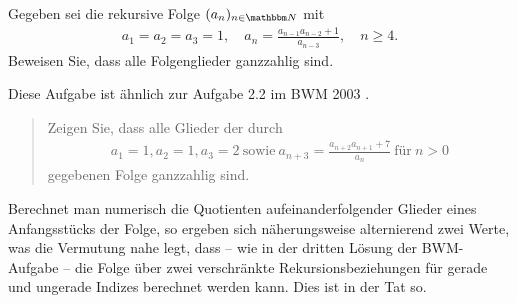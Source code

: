 \documentclass[11pt,a4paper]{article}
\begin{document}
\begin{aufgabe} Gegeben sei die rekursive Folge $(a_n)_{n\in\N } $ mit
\begin{gather*}
a_1=a_2=a_3=1,\quad a_{n}=\frac{a_{n-1}a_{n-2} +1}{a_{n-3}}, \quad n\ge 4.
\end{gather*}
Beweisen Sie, dass alle Folgenglieder ganzzahlig sind.
\end{aufgabe}

Diese Aufgabe ist ähnlich zur Aufgabe 2.2 im BWM 2003 \cite{BWM2003.2}. 
\begin{quote}
  Zeigen Sie, dass alle Glieder der durch 
  \begin{gather*}
    a_1=1, a_2=1, a_3=2\ \text{sowie}\ a_{n+3}=\frac{a_{n+2}a_{n+1}+7}{a_n}\
    \text{für}\ n>0 
  \end{gather*}
  gegebenen Folge ganzzahlig sind.  
\end{quote}
Berechnet man numerisch die Quotienten aufeinanderfolgender Glieder eines
Anfangsstücks der Folge, so ergeben sich näherungsweise alternierend zwei
Werte, was die Vermutung nahe legt, dass -- wie in der dritten Lösung der
BWM-Aufgabe -- die Folge über zwei verschränkte Rekursionsbeziehungen für
gerade und ungerade Indizes berechnet werden kann.  Dies ist in der Tat so.
\end{document}
